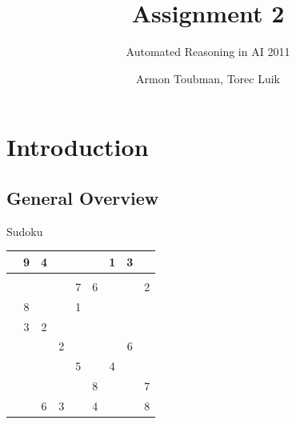 \documentclass{beamer}
\title{Assignment 2}
\subtitle
{Automated Reasoning in AI 2011} %
\author{Armon Toubman, Torec Luik}
\begin{document}
\begin{frame}
  \titlepage
\end{frame}





\section{Introduction}

\subsection[General]{General Overview}

\begin{frame}{Sudoku}

\begin{table}[htbp]
        \begin{tabular}{||c|c|c||c|c|c||c|c|c||}
        \hline
        \hline
         & 9 & 4 &  &  &  & 1 & 3 & \\
        \hline
         &  &  &  &  &  &  &  & \\
        \hline
         &  &  &  & 7 & 6 &  &  & 2\\
        \hline
        \hline
         & 8 &  &  & 1 &  &  &  & \\
        \hline
         & 3 & 2 &  &  &  &  &  & \\
        \hline
         &  &  & 2 &  &  &  & 6 & \\
        \hline
        \hline
         &  &  &  & 5 &  & 4 &  & \\
        \hline
         &  &  &  &  & 8 &  &  & 7\\
        \hline
         &  & 6 & 3 &  & 4 &  &  & 8\\
        \hline
        \hline
        \end{tabular}
    \end{table}
\end{frame}
\end{document}
